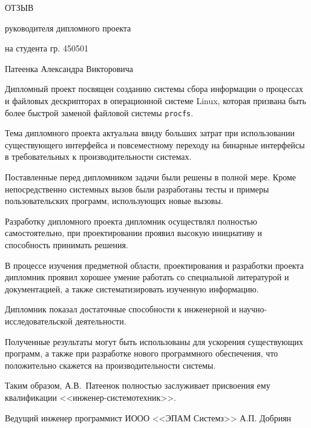 


\centerline{ОТЗЫВ}
\centerline{руководителя дипломного проекта}
\centerline{на студента гр. 450501}
\centerline{Патеенка Александра Викторовича}
\vspace{\baselineskip}

Дипломный проект посвящен созданию системы сбора информации о процессах и
файловых дескрипторах в операционной системе Linux, которая призвана быть более
быстрой заменой файловой системы \texttt{procfs}.

Тема дипломного проекта актуальна ввиду больших затрат при использовании
существующего интерфейса и повсеместному переходу на бинарные интерфейсы в
требовательных к производительности системах.

Поставленные перед дипломником задачи были решены в полной мере. Кроме
непосредственно системных вызов были разработаны тесты и примеры
пользовательских программ, использующих новые вызовы.

Разработку дипломного проекта дипломник осуществлял полностью самостоятельно, при
проектировании проявил высокую инициативу и способность принимать решения.

В процессе изучения предметной области, проектирования и разработки проекта
дипломник проявил хорошее умение работать со специальной литературой и
документацией, а также систематизировать изученную информацию.

Дипломник показал достаточные способности к инженерной и
научно-исследовательской деятельности.

Полученные результаты могут быть использованы для ускорения существующих
программ, а также при разработке нового программного обеспечения, что
положительно скажется на производительности системы.

Таким образом, А.В.~Патеенок полностью заслуживает присвоения ему квалификации
<<инженер-системотехник>>.

\vspace{\baselineskip}
\noindent
Ведущий инженер программист ИООО <<ЭПАМ Системз>> \hfill А.П. Добриян


